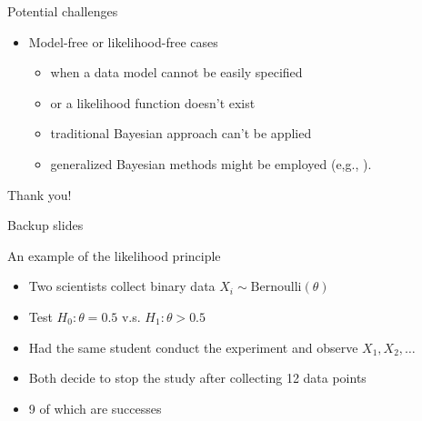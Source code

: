 \documentclass[11pt
,fragile=singleslide
,xcolor=dvipsnames
]{beamer}
\begin{document}
\begin{frame}{Potential challenges}
	\begin{itemize}
		\item Model-free or likelihood-free cases
		\begin{itemize}
			\item when a data model cannot be easily specified 
			\item or a likelihood function doesn't exist
			\item traditional Bayesian approach can't be applied
			\pause
			\item \textcolor{Cerulean}{generalized Bayesian} methods might be employed (e,g., \cite{turner2014generalized, lyddon2019general, bissiri2016general}).
		\end{itemize}
	\end{itemize}
	
\end{frame}


\begin{frame}
	\Huge{\centerline{Thank you!}}
\end{frame}


\begin{frame}
	\Huge{\centerline{Backup slides}}
\end{frame}


\begin{frame}{An example of the likelihood principle}
	\begin{itemize}
		\item Two scientists collect binary data $X_i \sim \text{Bernoulli}(\theta)$
		\item Test $H_0: \theta = 0.5$ v.s. $H_1: \theta > 0.5$
		\item Had the same student conduct the experiment and observe $X_1, X_2, \ldots$
		\pause
		\item Both decide to stop the study after collecting 12 data points
		\item 9 of which are successes
	\end{itemize}
	

\end{frame}
\end{document}
